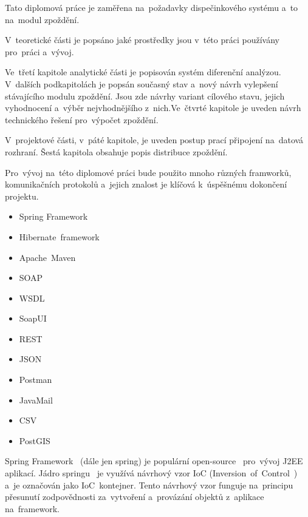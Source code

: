 
Tato diplomová práce je zaměřena na~požadavky dispečinkového systému a~to na~modul zpoždění.

V~teoretické části je popsáno jaké prostředky jsou v~této práci používány pro~práci a~vývoj.

Ve~třetí kapitole analytické části je popisován systém diferenční analýzou. V~dalších podkapitolách je popsán současný stav a~nový návrh vylepšení stávajícího modulu zpoždění. Jsou zde návrhy variant cílového stavu, jejich vyhodnocení a~výběr nejvhodnějšího z~nich.Ve~čtvrté kapitole je uveden návrh technického řešení pro~výpočet zpoždění.

V~projektové části, v~páté kapitole, je uveden postup prací připojení na~datová rozhraní.
Šestá kapitola obsahuje popis distribuce zpoždění.



Pro~vývoj na~této diplomové práci bude použito mnoho různých framworků, komunikačních protokolů a~jejich znalost je klíčová k~úspěšnému dokončení projektu.  
\begin{itemize}
	\setlength{\parskip}{0pt}
	\setlength{\itemsep}{0pt}
	\item {Spring Framework}
	\item {Hibernate~framework}
	\item {Apache~Maven}
	\item {SOAP}
	\item {WSDL}
	\item {SoapUI}
	\item {REST}
	\item {JSON}
	\item {Postman}
	\item {JavaMail}
	\item {CSV}
	\item {PostGIS}
\end{itemize}
Spring Framework~\cite{spring-framework} (dále jen spring) je populární open-source~\cite{open-source} pro~vývoj J2EE~\cite{j2ee} aplikací. Jádro springu~\cite{spring-in-action} je využívá návrhový vzor IoC (Inversion~of~Control~\cite{ioc}) a~je označován jako IoC~kontejner. Tento návrhový vzor funguje na~principu přesunutí zodpovědnosti za~vytvoření a~provázání objektů z~aplikace na~framework.

